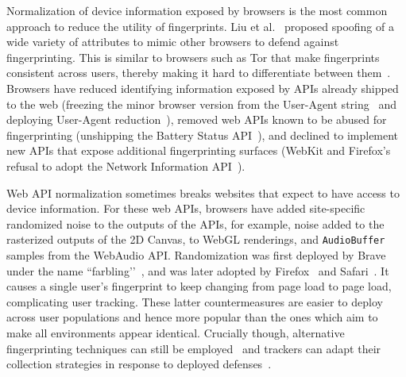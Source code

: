 Normalization of device information exposed by browsers is the most common approach to reduce the utility of fingerprints. 
%
Liu et al.~\cite{liuGummyBrowsersTargeted2022} proposed spoofing of a wide variety of attributes to mimic other browsers to defend against fingerprinting.
%
This is similar to browsers such as Tor that make fingerprints consistent across users, thereby making it hard to differentiate between them~\cite{perryDesignImplementationTor2013}. 
%
Browsers have reduced identifying information exposed by APIs already shipped to the web (freezing the minor browser version from the User-Agent string~\cite{weissIntentDeprecateFreeze2020} and deploying User-Agent reduction~\cite{davisReleaseNotesSafari2017,kimura1609304ReduceGeckos2020,googleWhatUserAgentReduction2024}), removed web APIs known to be abused for fingerprinting (unshipping the Battery Status API~\cite{olejnikBatteryStatusNot2017}), and declined to implement new APIs that expose additional fingerprinting surfaces (WebKit and Firefox’s refusal to adopt the Network Information API~\cite{TrackingPreventionWebKit2020,thomsonNetworkInformationAPI2018}). 

%
Web API normalization sometimes breaks websites that expect to have access to device information. 
%
%
For these web APIs, browsers have added site-specific randomized noise to the outputs of the APIs, for example, noise added to the rasterized outputs of the 2D Canvas, to WebGL renderings, and \texttt{AudioBuffer} samples from the WebAudio API. 
%
Randomization was first deployed by Brave under the name ``farbling’’~\cite{braveprivacyteamFingerprintingDefenses202020}, and was later adopted by Firefox~\cite{huang1816056FprandomizationMeta2023} and Safari~\cite{wilanderPrivateBrowsing202024}. It causes a single user's fingerprint to keep changing from page load to page load, complicating user tracking. 
%
These latter countermeasures are easier to deploy across user populations and hence more popular than the ones which aim to make all environments appear identical\cite{nikiforakisPriVaricatorDeceivingFingerprinters2015}.
% 
Crucially though, alternative fingerprinting techniques can still be employed~\cite{linFashionFauxPas2023} and trackers can adapt their collection strategies in response to deployed defenses~\cite{vastel2020fp}.

